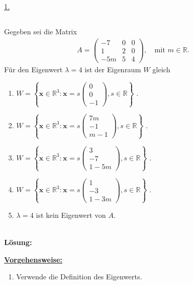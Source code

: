 \underline{1. }\\

\newpage

\subsection*{}
Gegeben sei die Matrix
\begin{align*}
	A =
	\begin{pmatrix}
		-7 & 0 & 0 \\
		1 & 2 & 0 \\
		-5m & 5 & 4
	\end{pmatrix}
	, 
	\quad 
	\textrm{mit } m \in \mathbb{R}.
\end{align*}
Für den Eigenwert $ \lambda = 4 $ ist der Eigenraum $ W $ gleich
\renewcommand{\labelenumi}{(\alph{enumi})}
\begin{enumerate}
	\item 
	$ W
	=
	\left\{
	\textbf{x} \in \mathbb{R}^3
	:
	\textbf{x}
	=
	s 
	\begin{pmatrix}
		0\\ 0 \\ -1
	\end{pmatrix},
	s \in \mathbb{R}
	\right\}
	$
	.
	\item 
	$ W
	=
	\left\{
	\textbf{x} \in \mathbb{R}^3
	:
	\textbf{x}
	=
	s	 
	\begin{pmatrix}
		7m \\ -1 \\ m-1
	\end{pmatrix},
	s \in \mathbb{R}
	\right\}
	$
	.
	\item
	$ W
	=
	\left\{
	\textbf{x} \in \mathbb{R}^3
	:
	\textbf{x}
	=
	s	 
	\begin{pmatrix}
		3 \\ -7 \\ 1 - 5m
	\end{pmatrix},
	s \in \mathbb{R}
	\right\}
	$
	.
	\item
	$ W
	=
	\left\{
	\textbf{x} \in \mathbb{R}^3
	:
	\textbf{x}
	=
	s	 
	\begin{pmatrix}
		1 \\ -3 \\ 1 - 3m
	\end{pmatrix},
	s \in \mathbb{R}
	\right\}
	$
	.
	\item
	$ \lambda = 4 $ ist kein Eigenwert von $ A $.
\end{enumerate}
\ \\
\textbf{Lösung:}
\begin{mdframed}
\underline{\textbf{Vorgehensweise:}}
\renewcommand{\labelenumi}{\theenumi.}
\begin{enumerate}
\item Verwende die Definition des Eigenwerts.
\end{enumerate}
\end{mdframed}


